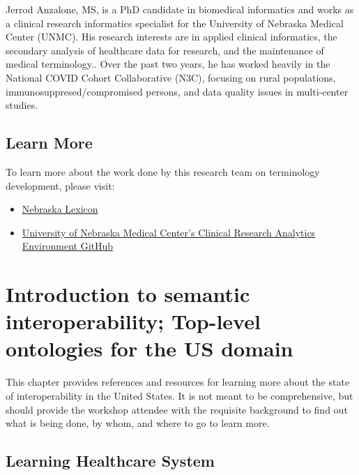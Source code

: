 \documentclass[
]{journal}
\begin{document}
Jerrod Anzalone, MS, is a PhD candidate in biomedical informatics and works as a clinical research informatics specialist for the University of Nebraska Medical Center (UNMC). His research interests are in applied clinical informatics, the secondary analysis of healthcare data for research, and the maintenance of medical terminology.. Over the past two years, he has worked heavily in the National COVID Cohort Collaborative (N3C), focusing on rural populations, immunosuppresed/compromised persons, and data quality issues in multi-center studies.

\hypertarget{learn-more}{%
\subsection{Learn More}\label{learn-more}}

To learn more about the work done by this research team on terminology development, please visit:

\begin{itemize}
\item
  \href{https://www.unmc.edu/pathology-research/bioinformatics/campbell/tdc.html}{Nebraska Lexicon}
\item
  \href{https://github.com/UNMC-CRANE}{University of Nebraska Medical Center's Clinical Research Analytics Environment GitHub}
\end{itemize}

\hypertarget{introduction-to-semantic-interoperability-top-level-ontologies-for-the-us-domain}{%
\section{Introduction to semantic interoperability; Top-level ontologies for the US domain}\label{introduction-to-semantic-interoperability-top-level-ontologies-for-the-us-domain}}

This chapter provides references and resources for learning more about the state of interoperability in the United States. It is not meant to be comprehensive, but should provide the workshop attendee with the requisite background to find out what is being done, by whom, and where to go to learn more.

\hypertarget{learning-healthcare-system}{%
\subsection{Learning Healthcare System}\label{learning-healthcare-system}}
\end{document}

